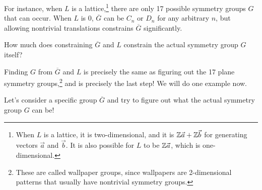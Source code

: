 For instance, when $L$ is a lattice,\footnote{When $L$ is a lattice, it is two-dimensional, and it is $\mathbb Z\vec{a} + \mathbb Z\vec{b}$ for generating vectors $\vec{a}$ and $\vec{b}.$ It is also possible for $L$ to be $\mathbb Z\vec{a}$, which is one-dimensional.} there are only 17 possible symmetry groups $G$ that can occur. When $L$ is 0, $\overline{G}$ can be $C_n$ or $D_n$ for any arbitrary $n$, but allowing nontrivial translations constrains $\overline{G}$ significantly.

\begin{question}%
How much does constraining $\overline{G}$ and $L$ constrain the actual symmetry group $G$ itself?
\end{question}

\begin{ans}
Finding $G$ from $\overline{G}$ and $L$ is precisely the same as figuring out the 17 plane symmetry groups,\footnote{These are called wallpaper groups, since wallpapers are 2-dimensional patterns that usually have nontrivial symmetry groups.} and is precisely the last step! We will do one example now.
\end{ans}

Let's consider a specific group $\overline{G}$ and try to figure out what the actual symmetry group $G$ can be!

